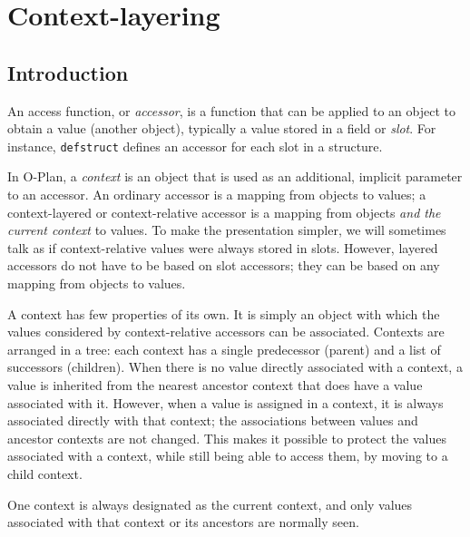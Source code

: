 

\raggedbottom





\section{Context-layering}

\subsection{Introduction}

An access function, or {\em accessor}, is a function that can be
applied to an object to obtain a value (another object), typically a
value stored in a field or {\em slot}.  For instance, {\tt defstruct}
defines an accessor for each slot in a structure.

In O-Plan, a {\em context\/} is an object that is used as an
additional, implicit parameter to an accessor.  An ordinary accessor is
a mapping from objects to values; a context-layered or context-relative
accessor is a mapping from objects {\em and the current context\/} to
values.  To make the presentation simpler, we will sometimes talk as if
context-relative values were always stored in slots.  However, layered
accessors do not have to be based on slot accessors; they can be based
on any mapping from objects to values.

A context has few properties of its own.  It is simply an object with
which the values considered by context-relative accessors can be
associated.  Contexts are arranged in a tree: each context has a
single predecessor (parent) and a list of successors (children).  
When there is no value directly associated with a context, a value is
inherited from the nearest ancestor context that does have a value
associated with it.  However, when a value is assigned in a context,
it is always associated directly with that context; the associations
between values and ancestor contexts are not changed.  This makes it
possible to protect the values associated with a context, while
still being able to access them, by moving to a child context.

One context is always designated as the current context, and only
values associated with that context or its ancestors are normally
seen.

